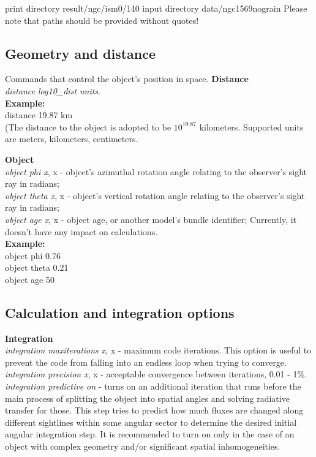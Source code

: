 \documentclass[a4paper]{article}
\begin{document}
\hspace*{0.25cm} print directory result/ngc/ism0/140
\vspace*{0.05cm}
\hspace*{0.25cm} input directory data/ngc1569nograin
\vspace*{0.25cm}
Please note that paths should be provided without quotes!\\

\subsection{Geometry and distance}
Commands that control the object's position in space.
    {\bf Distance}\\
    {\it distance log10\_dist units}.\\

    {\bf Example:}\\
distance 19.87 km \\
(The distance to the object is adopted to be $10^{19.87}$ kilometers.
Supported units are meters, kilometers, centimeters.

    {\bf Object}\\
    {\it object phi x}, x - object's azimuthal rotation angle relating to the observer's sight ray in radians;\\
    {\it object theta x}, x - object's vertical rotation angle relating to the observer's sight ray in radians;\\
    {\it object age x}, x - object age, or another model's bundle identifier; Currently, it doesn't have any impact on calculations.\\

    {\bf Example:}\\
object phi 0.76\\
object theta 0.21\\
object age 50\\

\subsection{Calculation and integration options}
{\bf Integration}\\
    {\it integration maxiterations x}, x - maximum code iterations.
This option is useful to prevent the code from falling into an endless loop when trying to converge.\\
    {\it integration precision x}, x - acceptable convergence between iterations, 0.01 - 1\%. \\
    {\it integration predictive on} - turns on an additional iteration that runs before the main process of splitting the object into spatial angles and solving
radiative transfer for those.
This step tries to predict how much fluxes are changed along different sightlines within some angular sector
to determine the desired initial angular integration step.
It is recommended to turn on only in the case of an object with complex geometry and/or
significant spatial inhomogeneities.
\end{document}
